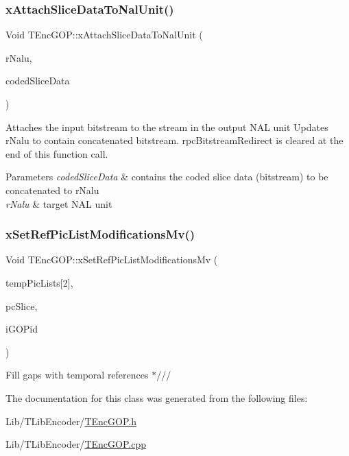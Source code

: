 \subsubsection{\texorpdfstring{x\+Attach\+Slice\+Data\+To\+Nal\+Unit()}{xAttachSliceDataToNalUnit()}}
{\footnotesize\ttfamily Void T\+Enc\+G\+O\+P\+::x\+Attach\+Slice\+Data\+To\+Nal\+Unit (\begin{DoxyParamCaption}\item[{\hyperlink{struct_output_n_a_l_unit}{Output\+N\+A\+L\+Unit} \&}]{r\+Nalu,  }\item[{\hyperlink{class_t_com_output_bitstream}{T\+Com\+Output\+Bitstream} $\ast$}]{coded\+Slice\+Data }\end{DoxyParamCaption})}

Attaches the input bitstream to the stream in the output N\+AL unit Updates r\+Nalu to contain concatenated bitstream. rpc\+Bitstream\+Redirect is cleared at the end of this function call. 
\begin{DoxyParams}{Parameters}
{\em coded\+Slice\+Data} & contains the coded slice data (bitstream) to be concatenated to r\+Nalu \\
\hline
{\em r\+Nalu} & target N\+AL unit \\
\hline
\end{DoxyParams}
\mbox{\label{class_t_enc_g_o_p_acdf2285353665293d998ded09e121518}} 
\subsubsection{\texorpdfstring{x\+Set\+Ref\+Pic\+List\+Modifications\+Mv()}{xSetRefPicListModificationsMv()}}
{\footnotesize\ttfamily Void T\+Enc\+G\+O\+P\+::x\+Set\+Ref\+Pic\+List\+Modifications\+Mv (\begin{DoxyParamCaption}\item[{std\+::vector$<$ \hyperlink{class_t_com_pic}{T\+Com\+Pic} $\ast$$>$}]{temp\+Pic\+Lists\mbox{[}2\mbox{]},  }\item[{\hyperlink{class_t_com_slice}{T\+Com\+Slice} $\ast$}]{pc\+Slice,  }\item[{U\+Int}]{i\+G\+O\+Pid }\end{DoxyParamCaption})\hspace{0.3cm}{\ttfamily [protected]}}


\begin{DoxyItemize}
\item Fill gaps with temporal references $\ast$/// 
\end{DoxyItemize}

The documentation for this class was generated from the following files\+:\begin{DoxyCompactItemize}
\item 
Lib/\+T\+Lib\+Encoder/\hyperlink{_t_enc_g_o_p_8h}{T\+Enc\+G\+O\+P.\+h}\item 
Lib/\+T\+Lib\+Encoder/\hyperlink{_t_enc_g_o_p_8cpp}{T\+Enc\+G\+O\+P.\+cpp}\end{DoxyCompactItemize}
